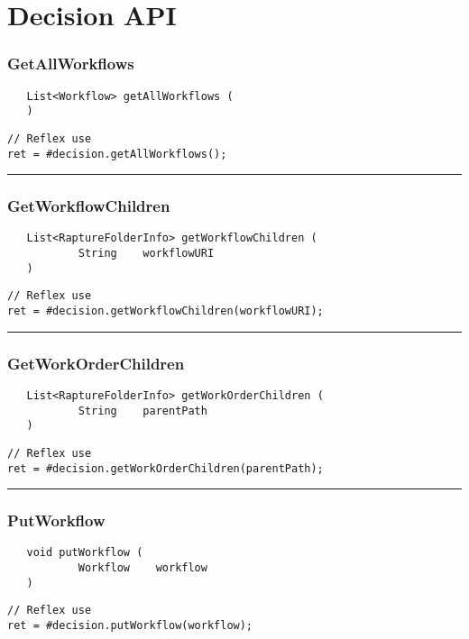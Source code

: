 \section{Decision API}

\subsubsection{GetAllWorkflows}
\label{Api:GetAllWorkflows}
\begin{verbatim}
   List<Workflow> getAllWorkflows (
   )
\end{verbatim}
\begin{lstlisting}[language=reflex]
// Reflex use
ret = #decision.getAllWorkflows();
\end{lstlisting}



\rule{15cm}{2pt}
\subsubsection{GetWorkflowChildren}
\label{Api:GetWorkflowChildren}
\begin{verbatim}
   List<RaptureFolderInfo> getWorkflowChildren (
           String    workflowURI
   )
\end{verbatim}
\begin{lstlisting}[language=reflex]
// Reflex use
ret = #decision.getWorkflowChildren(workflowURI);
\end{lstlisting}



\rule{15cm}{2pt}
\subsubsection{GetWorkOrderChildren}
\label{Api:GetWorkOrderChildren}
\begin{verbatim}
   List<RaptureFolderInfo> getWorkOrderChildren (
           String    parentPath
   )
\end{verbatim}
\begin{lstlisting}[language=reflex]
// Reflex use
ret = #decision.getWorkOrderChildren(parentPath);
\end{lstlisting}



\rule{15cm}{2pt}
\subsubsection{PutWorkflow}
\label{Api:PutWorkflow}
\begin{verbatim}
   void putWorkflow (
           Workflow    workflow
   )
\end{verbatim}
\begin{lstlisting}[language=reflex]
// Reflex use
ret = #decision.putWorkflow(workflow);
\end{lstlisting}



